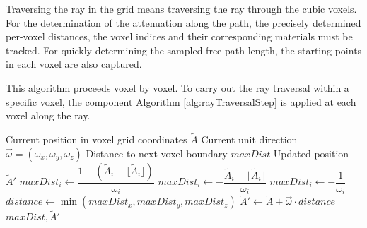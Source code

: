 Traversing the ray in the grid means traversing the ray through the cubic
voxels. For the determination of the attenuation along the path, the precisely
determined per-voxel distances, the voxel indices and their
corresponding materials must be tracked. For quickly determining the sampled
free path length, the starting points in each voxel are also captured. 

This algorithm proceeds voxel by voxel. To carry out the ray traversal within a
specific voxel, the component Algorithm \ref{alg:rayTraversalStep} is applied at
each voxel along the ray.

\begin{algorithm}[H]
\caption{Ray Traversal Algorithm: Step}
\label{alg:rayTraversalStep}
\begin{algorithmic}[1]
\Require Current position in voxel grid coordinates $\tilde{A}$
\Require Current unit direction $\vec{\omega} = (\omega_x, \omega_y, \omega_z)$
\Ensure Distance to next voxel boundary $maxDist$
\Ensure Updated position $\tilde{A}'$
     \label{alg:rayTraversalStep:line:positive}
        \State $maxDist_i \gets \dfrac{1 - (\tilde{A}_i - \lfloor\tilde{A}_i\rfloor)}{\omega_i}$
     \label{alg:rayTraversalStep:line:negative}
        \State $maxDist_i \gets - \dfrac{\tilde{A}_i -\lfloor\tilde{A}_i\rfloor}{\omega_i}$
     \label{alg:rayTraversalStep:line:negativeBoundary}
        \State $maxDist_i \gets -\dfrac{1}{\omega_i}$
    \EndIf
\EndFor
\State $distance \gets \min(maxDist_x, maxDist_y, maxDist_z)$
\State $\tilde{A}' \gets \tilde{A} + \vec{\omega} \cdot distance$
\State \Return $maxDist, \tilde{A}'$
\end{algorithmic}
\end{algorithm}

